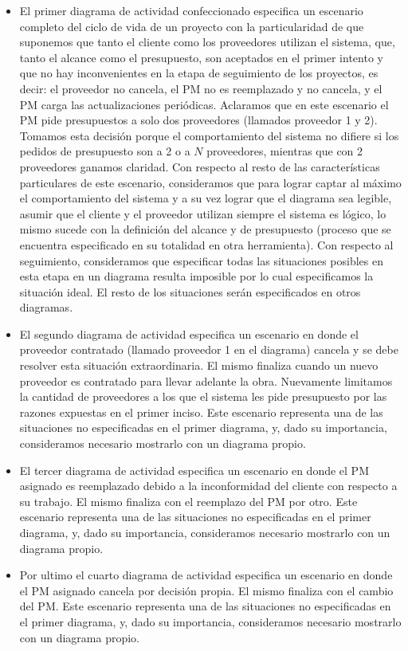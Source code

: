 \begin{itemize}
  \item El primer diagrama de actividad confeccionado especifica un escenario completo del ciclo de vida de un proyecto con la particularidad de que suponemos que tanto el cliente como los proveedores utilizan el sistema, que, tanto el alcance como el presupuesto, son aceptados en el primer intento y que no hay inconvenientes en la etapa de seguimiento de los proyectos, es decir: el proveedor no cancela, el PM no es reemplazado y no cancela, y el PM carga las actualizaciones periódicas. Aclaramos que en este escenario el PM pide presupuestos a solo dos proveedores (llamados proveedor 1 y 2). Tomamos esta decisión porque el comportamiento del sistema no difiere si los pedidos de presupuesto son a 2 o a $N$ proveedores, mientras que con 2 proveedores ganamos claridad. Con respecto al resto de las características particulares de este escenario, consideramos que para lograr captar al máximo el comportamiento del sistema y a su vez lograr que el diagrama sea legible, asumir que el cliente y el proveedor utilizan siempre el sistema es lógico, lo mismo sucede con la definición del alcance y de presupuesto (proceso que se encuentra especificado en su totalidad en otra herramienta). Con respecto al seguimiento, consideramos que especificar todas las situaciones posibles en esta etapa en un diagrama resulta imposible por lo cual especificamos la situación ideal. El resto de los situaciones serán especificados en otros diagramas.

  \item El segundo diagrama de actividad especifica un escenario en donde el proveedor contratado (llamado proveedor 1 en el diagrama) cancela y se debe resolver esta situación extraordinaria. El mismo finaliza cuando un nuevo proveedor es contratado para llevar adelante la obra. Nuevamente limitamos la cantidad de proveedores a los que el sistema les pide presupuesto por las razones expuestas en el primer inciso. Este escenario representa una de las situaciones no especificadas en el primer diagrama, y, dado su importancia, consideramos necesario mostrarlo con un diagrama propio.

  \item El tercer diagrama de actividad especifica un escenario en donde el PM asignado es reemplazado debido a la inconformidad del cliente con respecto a su trabajo. El mismo finaliza con el reemplazo del PM por otro. Este escenario representa una de las situaciones no especificadas en el primer diagrama, y, dado su importancia, consideramos necesario mostrarlo con un diagrama propio.

  \item Por ultimo el cuarto diagrama de actividad especifica un escenario en donde el PM asignado cancela por decisión propia. El mismo finaliza con el cambio del PM. Este escenario representa una de las situaciones no especificadas en el primer diagrama, y, dado su importancia, consideramos necesario mostrarlo con un diagrama propio.

\end{itemize}

